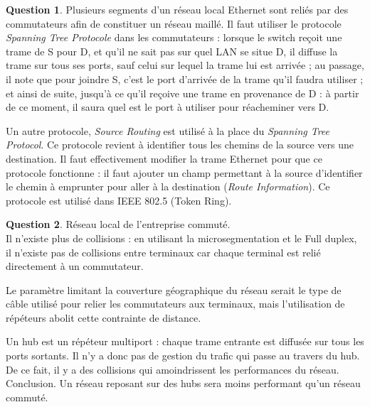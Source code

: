 \documentclass[11pt,english,french]{scrreprt}
\theoremstyle{remark}
\theoremstyle{definition}
\newtheorem{ques}{Question}[section]
\begin{document}
\begin{ques}
	Plusieurs segments d'un réseau local Ethernet sont reliés par des commutateurs afin de constituer un réseau maillé. Il faut utiliser le protocole \emph{Spanning Tree Protocole} dans les commutateurs : lorsque le switch reçoit une trame de S pour D, et qu'il ne sait pas sur quel LAN se situe D, il diffuse la trame sur tous ses ports, sauf celui sur lequel la trame lui est arrivée ; au passage, il note que pour joindre S, c'est le port d'arrivée de
	la trame qu'il faudra utiliser ; et ainsi de suite, jusqu'à ce qu'il reçoive une trame en provenance de D : à partir de ce moment, il saura quel est le port à utiliser pour réacheminer vers D.
	
	Un autre protocole, \emph{Source Routing} est utilisé à la place du \emph{Spanning Tree Protocol}. Ce protocole revient à identifier tous les chemins de la source vers une destination. Il faut effectivement modifier la trame Ethernet pour que ce protocole fonctionne : il faut ajouter un champ permettant à la source d'identifier le chemin à emprunter pour aller à la destination (\emph{Route Information}). Ce protocole est utilisé dans IEEE 802.5 (Token Ring).
\end{ques}

\begin{ques}
	Réseau local de l'entreprise commuté.\\
	Il n'existe plus de collisions : en utilisant la microsegmentation et le Full duplex, il n'existe pas de collisions entre terminaux car chaque terminal est relié directement à un commutateur.
	
	Le paramètre limitant la couverture géographique du réseau serait le type de câble utilisé pour relier les commutateurs aux terminaux, mais l'utilisation de répéteurs abolit cette contrainte de distance.

	Un hub est un répéteur multiport : chaque trame entrante est diffusée sur tous les ports sortants. Il n'y a donc pas de gestion du trafic qui passe au travers du hub. De ce fait, il y a des collisions qui amoindrissent les performances du réseau.\\
	Conclusion. Un réseau reposant sur des hubs sera moins performant qu'un réseau commuté.
\end{ques}
\end{document}
